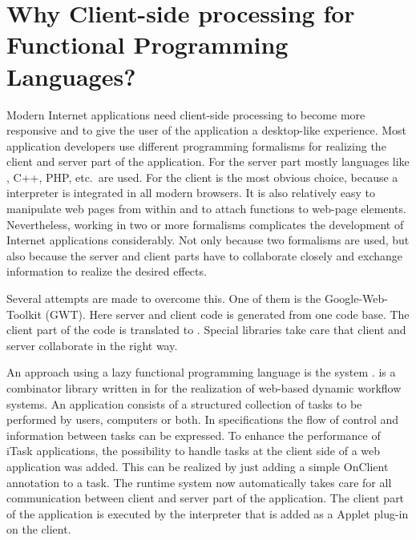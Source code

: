 \section{Why Client-side processing for Functional Programming Languages?} \label{sapljs:sec:motivation}
Modern Internet applications need client-side processing to become more responsive and to give 
the user of the application a desktop-like experience.
Most application developers use different programming formalisms for realizing the client and server part of the application.
For the server part mostly languages like \Java, \textsf{C++}, \textsf{PHP}, etc.\ are used.
For the client \JS is the most obvious choice, because a \JS interpreter is integrated in all modern browsers.
It is also relatively easy to manipulate web pages from within \JS and to attach \JS functions to web-page elements.
Nevertheless, working in two or more formalisms complicates the development of Internet applications considerably. 
Not only because two formalisms are used, but also because the server and client parts have to collaborate closely
and exchange information to realize the desired effects.

Several attempts are made to overcome this. One of them is the Google-Web-Toolkit (\textsf{GWT}). 
Here server and client code is generated from one \Java code base. 
The client part of the code is translated to \JS.
Special libraries take care that client and server collaborate in the right way.

An  approach using a lazy functional programming language is the \iTask system \cite{ITASK}. 
\iTask is a combinator library written in  \Clean 
for the realization of web-based dynamic workflow systems\cite{LDTA2010,ITASK_AJAX}. 
An \iTask application consists of a structured collection of tasks to be performed by users, 
computers or both.
In \iTask specifications the flow of control and information between tasks can be expressed. 
To enhance the performance of \textsf{iTask} applications, 
the possibility to handle tasks at the client side of a web application was added. 
This can be realized by just adding a simple \textsf{OnClient} annotation to a task. 
The \iTask runtime system now automatically takes care for all communication between 
client and server part of the application. The client part of the application is executed
by the \Sapl interpreter that is added as a \Java Applet plug-in on the client.

